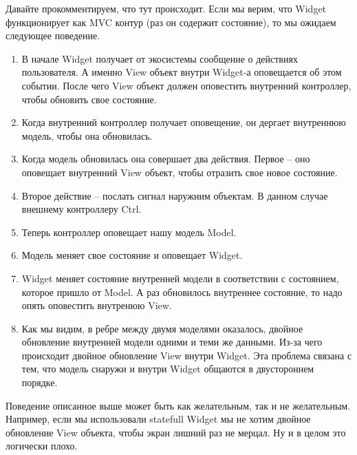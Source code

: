 Давайте прокомментируем, что тут происходит.
Если мы верим, что Widget функционирует как MVC контур (раз он содержит состояние), то мы ожидаем следующее поведение.
\begin{enumerate}
\item В начале Widget получает от экосистемы сообщение о действиях пользователя.
А именно View объект внутри Widget-а оповещается об этом событии.
После чего View объект должен оповестить внутренний контроллер, чтобы обновить свое состояние.

\item Когда внутренний контроллер получает оповещение, он дергает внутреннюю модель, чтобы она обновилась.

\item Когда модель обновилась она совершает два действия.
Первое -- оно оповещает внутренний View объект, чтобы отразить свое новое состояние.

\item Второе действие -- послать сигнал наружним объектам.
В данном случае внешнему контроллеру Ctrl.

\item Теперь контроллер оповещает нашу модель Model.

\item Модель меняет свое состояние и оповещает Widget.

\item Widget меняет состояние внутренней модели в соответствии с состоянием, которое пришло от Model.
А раз обновилось внутреннее состояние, то надо опять оповестить внутренюю View.

\item Как мы видим, в ребре между двумя моделями оказалось, двойное обновление внутренней модели одними и теми же данными.
Из-за чего происходит двойное обновление View внутри Widget.
Эта проблема связана с тем, что модель снаружи и внутри Widget общаются в двустороннем порядке.
\end{enumerate}
Поведение описанное выше может быть как желательным, так и не желательным.
Например, если мы использовали statefull Widget мы не хотим двойное обновление View объекта, чтобы экран лишний раз не мерцал.
Ну и в целом это логически плохо.

